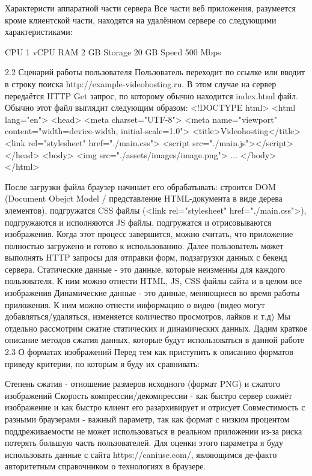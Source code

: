 \documentclass[12pt]{article}
\begin{document}
Характеристи аппаратной части сервера
Все части веб приложения, разумеется кроме клиентской части, находятся на удалённом сервере со следующими характеристиками:

CPU 1 vCPU
RAM 2 GB
Storage 20 GB
Speed 500 Mbps

2.2 Сценарий работы пользователя
Пользователь переходит по ссылке или вводит в строку поиска http://example-videohosting.ru. В этом случае на сервер передаётся HTTP Get запрос, по которому обычно находится index.html файл.
Обычно этот файл выглядит следующим образом:
<!DOCTYPE html>
<html lang="en">
<head>
    <meta charset="UTF-8">
    <meta name="viewport" content="width=device-width, initial-scale=1.0">
    <title>Videohosting</title>
    <link rel="stylesheet" href="./main.css">
    <script src="./main.js"></script>
</head>
<body>
    <img src="./assets/images/image.png">
    ...
</body>
</html>

После загрузки файла браузер начинает его обрабатывать: строится DOM (Document Obejct Model / представление HTML-документа в виде дерева элементов), подгружатся CSS файлы (<link rel="stylesheet" href="./main.css">), подгружаются и исполняются JS файлы, подгружатся и отрисовываются изображения.
Когда этот процесс завершится, можно считать, что приложение полностью загружено и готово к использованию.
Далее пользователь может выполнять HTTP запросы для отправки форм, подзагрузки данных с бекенд сервера.
Статические данные - это данные, которые неизменны для каждого пользователя. К ним можно отнести HTML, JS, CSS файлы сайта и в целом все изображения
Динамические данные - это данные, меняющиеся во время работы приложения. К ним можно отнести информацию о видео (видео могут добавляться/удаляться, изменяется количество просмотров, лайков и т.д)
Мы отдельно рассмотрим сжатие статических и динамических данных.
Дадим краткое описание методов сжатия данных, которые будут использоваться в данной работе
2.3 О форматах изображений
Перед тем как приступить к описанию форматов приведу критерии, по которым я буду их сравнивать:

Степень сжатия - отношение размеров исходного (формат PNG) и сжатого изображений
Скорость компрессии/декомпрессии - как быстро сервер сожмёт изображение и как быстро клиент его разархивирует и отрисует
Совместимость с разными браузерами - важный параметр, так как формат с низким процентом поддреживаемостм не может использоваться в реальном приложении из-за риска потерять большую часть пользователей. Для оценки этого параметра я буду использовать данные с сайта https://caniuse.com/, являющимся де-факто авторитетным справочником о технологиях в браузере.
\end{document}
